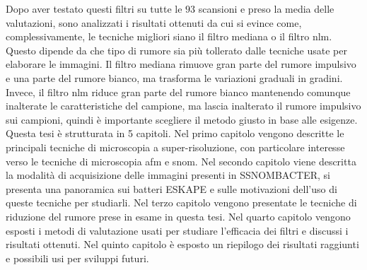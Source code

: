 \documentclass[../main.tex]{subfiles}
\begin{document}
Dopo aver testato questi filtri su tutte le $93$ scansioni e preso la media delle valutazioni, sono analizzati i risultati ottenuti da cui si evince come, complessivamente, le tecniche migliori siano il filtro mediana o il filtro \acrshort{nlm}. Questo dipende da che tipo di rumore sia più tollerato dalle tecniche usate per elaborare le immagini. Il filtro mediana rimuove gran parte del rumore impulsivo e una parte del rumore bianco, ma trasforma le variazioni graduali in gradini. Invece, il filtro \acrshort{nlm} riduce gran parte del rumore bianco mantenendo comunque inalterate le caratteristiche del campione, ma lascia inalterato il rumore impulsivo sui campioni, quindi è importante scegliere il metodo giusto in base alle esigenze.\\


\noindent Questa tesi è strutturata in 5 capitoli. Nel primo capitolo vengono descritte le principali tecniche di microscopia a super-risoluzione, con particolare interesse verso le tecniche di microscopia \acrshort{afm} e \acrshort{snom}. Nel secondo capitolo viene descritta la modalità di acquisizione delle immagini presenti in SSNOMBACTER\cite{ssnombacter}, si presenta una panoramica sui batteri ESKAPE\cite{eskape} e sulle motivazioni dell'uso di queste tecniche per studiarli. Nel terzo capitolo vengono presentate le tecniche di riduzione del rumore prese in esame in questa tesi. Nel quarto capitolo vengono esposti i metodi di valutazione usati per studiare l'efficacia dei filtri e discussi i risultati ottenuti. Nel quinto capitolo è esposto un riepilogo dei risultati raggiunti e possibili usi per sviluppi futuri.
\end{document}

